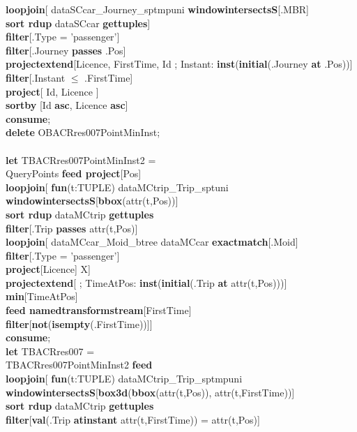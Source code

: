 \documentclass[a4paper]{article}
\newcommand{\op}[1]{\textbf{#1}}
\begin{document}
\begin{scriptsize}
\begin{tabbing}
\>\op{loopjoin}[ dataSCcar\_Journey\_sptmpuni \op{windowintersectsS}[.MBR]\\
\>\>\op{sort rdup} dataSCcar \op{gettuples}]\\
\>\op{filter}[.Type = 'passenger']\\
\>\op{filter}[.Journey \op{passes} .Pos]\\
\>\op{projectextend}[Licence, FirstTime, Id ; Instant: \op{inst}(\op{initial}(.Journey \op{at} .Pos))]\\
\>\op{filter}[.Instant $\leq$ .FirstTime]\\
\>\op{project}[ Id, Licence ]\\
\>\op{sortby} [Id \op{asc}, Licence \op{asc}]\\
\op{consume};\\
\op{delete} OBACRres007PointMinInst;\\
\\
\op{let} TBACRres007PointMinInst2 =\\
\>QueryPoints \op{feed project}[Pos]\\
\>\op{loopjoin}[ \op{fun}(t:TUPLE) dataMCtrip\_Trip\_sptuni \op{windowintersectsS}[\op{bbox}(attr(t,Pos))]\\
\>\>\op{sort rdup} dataMCtrip \op{gettuples}\\
\>\>\op{filter}[.Trip \op{passes} attr(t,Pos)]\\
\>\>\op{loopjoin}[ dataMCcar\_Moid\_btree dataMCcar \op{exactmatch}[.Moid]\\
\>\>\>\op{filter}[.Type = 'passenger']\\
\>\>\>\op{project}[Licence] {X}]\\
\>\>\op{projectextend}[ ; TimeAtPos: \op{inst}(\op{initial}(.Trip \op{at} attr(t,Pos)))]\\
\>\>\op{min}[TimeAtPos]\\
\>\>\op{feed namedtransformstream}[FirstTime]\\
\>\>\op{filter}[\op{not}(\op{isempty}(.FirstTime))]]\\
\op{consume};\\
\op{let} TBACRres007 =\\
\>TBACRres007PointMinInst2 \op{feed}\\
\>\op{loopjoin}[ \op{fun}(t:TUPLE) dataMCtrip\_Trip\_sptmpuni \op{windowintersectsS}[\op{box3d}(\op{bbox}(attr(t,Pos)), attr(t,FirstTime))]\\
\>\>\op{sort rdup} dataMCtrip \op{gettuples}\\
\>\>\op{filter}[\op{val}(.Trip \op{atinstant} attr(t,FirstTime)) = attr(t,Pos)]\\

\end{tabbing}
\end{scriptsize}
\end{document}
